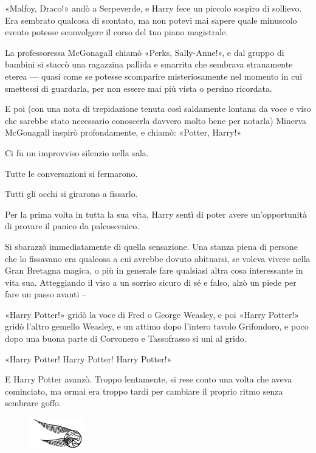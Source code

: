 «Malfoy, Draco!» andò a Serpeverde, e Harry fece un piccolo sospiro di sollievo. Era sembrato qualcosa di scontato, ma non potevi mai sapere quale minuscolo evento potesse sconvolgere il corso del tuo piano magistrale.

La professoressa McGonagall chiamò «Perks, Sally-Anne!», e dal gruppo di bambini si staccò una ragazzina pallida e smarrita che sembrava stranamente eterea — quasi come se potesse scomparire misteriosamente nel momento in cui smettessi di guardarla, per non essere mai più vista o persino ricordata.

E poi (con una nota di trepidazione tenuta così saldamente lontana da voce e viso che sarebbe stato necessario conoscerla davvero molto bene per notarla) Minerva McGonagall inspirò profondamente, e chiamò: «Potter, Harry!»

Ci fu un improvviso silenzio nella sala.

Tutte le conversazioni si fermarono.

Tutti gli occhi si girarono a fissarlo.

Per la prima volta in tutta la sua vita, Harry sentì di poter avere un’opportunità di provare il panico da palcoscenico.

Si sbarazzò immediatamente di quella sensazione. Una stanza piena di persone che lo fissavano era qualcosa a cui avrebbe dovuto abituarsi, se voleva vivere nella Gran Bretagna magica, o più in generale fare qualsiasi altra cosa interessante in vita sua. Atteggiando il viso a un sorriso sicuro di sé e falso, alzò un piede per fare un passo avanti –

«Harry Potter!» gridò la voce di Fred o George Weasley, e poi «Harry Potter!» gridò l’altro gemello Weasley, e un attimo dopo l’intero tavolo Grifondoro, e poco dopo una buona parte di Corvonero e Tassofrasso si unì al grido.

«Harry Potter! Harry Potter! Harry Potter!»

E Harry Potter avanzò. Troppo lentamente, si rese conto una volta che aveva cominciato, ma ormai era troppo tardi per cambiare il proprio ritmo senza sembrare goffo.

\begin{figure}[h!]
        \includegraphics[scale=0.4]{boccino.png}
        \centering
\end{figure}

